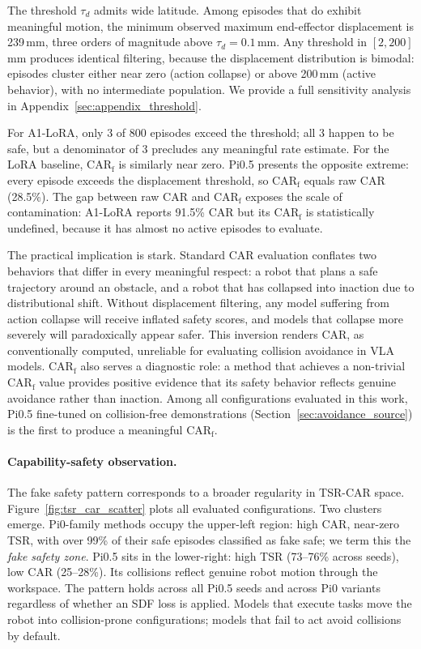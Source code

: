 The threshold $\tau_d$ admits wide latitude. Among episodes that do exhibit meaningful motion, the minimum observed maximum end-effector displacement is 239\,mm, three orders of magnitude above $\tau_d = 0.1$\,mm. Any threshold in $[2, 200]$\,mm produces identical filtering, because the displacement distribution is bimodal: episodes cluster either near zero (action collapse) or above 200\,mm (active behavior), with no intermediate population. We provide a full sensitivity analysis in Appendix~\ref{sec:appendix_threshold}.

For A1-LoRA, only 3 of 800 episodes exceed the threshold; all 3 happen to be safe, but a denominator of 3 precludes any meaningful rate estimate. For the LoRA baseline, CAR$_\text{f}$ is similarly near zero. Pi0.5 presents the opposite extreme: every episode exceeds the displacement threshold, so CAR$_\text{f}$ equals raw CAR (28.5\%). The gap between raw CAR and CAR$_\text{f}$ exposes the scale of contamination: A1-LoRA reports 91.5\% CAR but its CAR$_\text{f}$ is statistically undefined, because it has almost no active episodes to evaluate.

The practical implication is stark. Standard CAR evaluation conflates two behaviors that differ in every meaningful respect: a robot that plans a safe trajectory around an obstacle, and a robot that has collapsed into inaction due to distributional shift. Without displacement filtering, any model suffering from action collapse will receive inflated safety scores, and models that collapse more severely will paradoxically appear safer. This inversion renders CAR, as conventionally computed, unreliable for evaluating collision avoidance in VLA models. CAR$_\text{f}$ also serves a diagnostic role: a method that achieves a non-trivial CAR$_\text{f}$ value provides positive evidence that its safety behavior reflects genuine avoidance rather than inaction. Among all configurations evaluated in this work, Pi0.5 fine-tuned on collision-free demonstrations (Section~\ref{sec:avoidance_source}) is the first to produce a meaningful CAR$_\text{f}$.

\paragraph{Capability-safety observation.}
The fake safety pattern corresponds to a broader regularity in TSR-CAR space. Figure~\ref{fig:tsr_car_scatter} plots all evaluated configurations. Two clusters emerge. Pi0-family methods occupy the upper-left region: high CAR, near-zero TSR, with over 99\% of their safe episodes classified as fake safe; we term this the \emph{fake safety zone}. Pi0.5 sits in the lower-right: high TSR (73--76\% across seeds), low CAR (25--28\%). Its collisions reflect genuine robot motion through the workspace. The pattern holds across all Pi0.5 seeds and across Pi0 variants regardless of whether an SDF loss is applied. Models that execute tasks move the robot into collision-prone configurations; models that fail to act avoid collisions by default.


